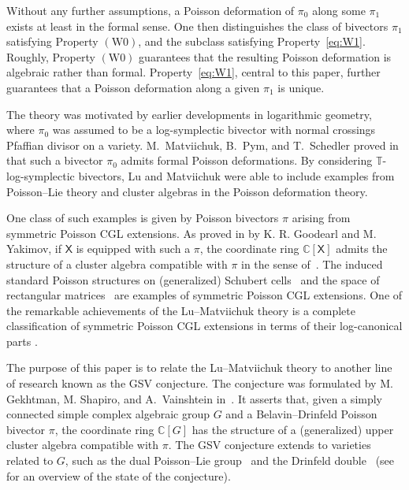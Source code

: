 \documentclass[11pt]{article}
\theoremstyle{definition}\newtheorem{definition}[theorem]{Definition}
\theoremstyle{definition}\newtheorem{remark}[theorem]{Remark}
\theoremstyle{remark}
\numberwithin{equation}{section}
\begin{document}
Without any further assumptions, a Poisson deformation of $\pi_0$ along some $\pi_1$ exists at least in the formal sense. One then distinguishes the class of bivectors $\pi_1$ satisfying Property $(\mathrm{W0})$, and the subclass satisfying Property~\eqref{eq:W1}. Roughly, Property $(\mathrm{W0})$ guarantees that the resulting Poisson deformation is algebraic rather than formal. Property~\eqref{eq:W1}, central to this paper, further guarantees that a Poisson deformation along a given $\pi_1$ is unique.

The theory was motivated by earlier developments in logarithmic geometry, where $\pi_0$ was assumed to be a log-symplectic bivector with normal crossings Pfaffian divisor on a variety. M.~Matviichuk, B.~Pym, and T.~Schedler proved in \cite{mps-torelli} that such a bivector $\pi_0$ admits formal Poisson deformations. By considering $\mathbb{T}$-log-symplectic bivectors, Lu and Matviichuk were able to include examples from Poisson--Lie theory and cluster algebras in the Poisson deformation theory. 

One class of such examples is given by Poisson bivectors \(\pi\) arising from symmetric Poisson CGL extensions. As proved in \cite[Theorem 11.1]{gy-cgl} by K. R. Goodearl and M. Yakimov, if $\mathsf{X}$ is equipped with such a $\pi$, the coordinate ring $\mathbb{C}[\mathsf{X}]$ admits the structure of a cluster algebra compatible with $\pi$ in the sense of~\cite{gsv-book}. The induced standard Poisson structures on (generalized) Schubert cells~\cite{elek-lu} and the space of rectangular matrices~\cite{gy-cgl} are examples of symmetric Poisson CGL extensions. One of the remarkable achievements of the Lu--Matviichuk theory is a complete classification of symmetric Poisson CGL extensions in terms of their log-canonical parts \cite[Theorem 4.4.3]{lm-deform}.

The purpose of this paper is to relate the Lu--Matviichuk theory to another line of research known as the GSV conjecture. The conjecture was formulated by M. Gekhtman, M. Shapiro, and A.~Vainshtein in~\cite{gsv-conj}. It asserts that, given a simply connected simple complex algebraic group $G$ and a Belavin--Drinfeld Poisson bivector $\pi$, the coordinate ring $\mathbb{C}[G]$ has the structure of a (generalized) upper cluster algebra compatible with $\pi$. The GSV conjecture extends to varieties related to $G$, such as the dual Poisson--Lie group~\cite{multdual} and the Drinfeld double~\cite{multdouble} (see~\cite{gsv-unified,multdual} for an overview of the state of the conjecture).
\end{document}
